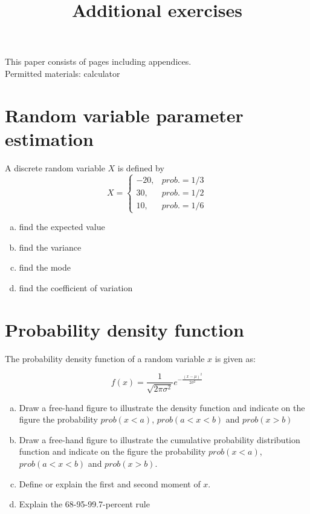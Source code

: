 \documentclass[12pt]{article}
\date{}
\begin{document}

\title{Additional exercises}

\maketitle 

This paper consists of \pageref{LastPage} pages including appendices. \\
Permitted materials: calculator

\section{Random variable parameter estimation}

A discrete random variable $X$ is defined by
  \begin{equation}
    X=
    \begin{cases}
      -20, & prob.=1/3 \\
       30, & prob.=1/2 \\
       10, & prob.=1/6
    \end{cases}
  \end{equation}

\begin{enumerate}[(a)] 
\item find the expected value
\item find the variance
\item find the mode
\item find the coefficient of variation
\end{enumerate}


\section{Probability density function}
The probability density function of a random variable $x$ is given as:

$$ f(x)=\frac{1}{\sqrt{2 \pi \sigma^2}} e^{- \frac{(x-\mu)^2}{2 \sigma^2}} $$

\begin{enumerate}[(a)] 
\item Draw a free-hand figure to illustrate the density function and indicate on the figure the probability $prob(x<a)$, $prob(a<x<b)$ and $prob(x>b)$
\item Draw a free-hand figure to illustrate the cumulative probability distribution function and indicate on the figure the probability $prob(x<a)$,  $prob(a<x<b)$ and $prob(x>b)$.
\item Define or explain the first and second moment of $x$.
\item Explain the 68-95-99.7-percent rule
\end{enumerate}
\end{document}
